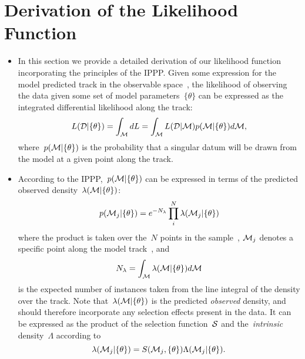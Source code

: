 \documentclass[ms.tex]{subfiles}
\begin{document}
\section{Derivation of the Likelihood Function}
\label{sec:weightnorm}

\begin{itemize}

	\item In this section we provide a detailed derivation of our likelihood
	function incorporating the principles of the IPPP.
	Given some expression for the model predicted track in the observable
	space~, the likelihood of observing the data given some set of
	model parameters~$\{\theta\}$ can be expressed as the integrated
	differential likelihood along the track:
	\begin{equation}
	L(\mathcal{D} | \{\theta\}) = \int_{\mathcal{M}} dL =
	\int_{\mathcal{M}} L(\mathcal{D} | \mathcal{M}) p(\mathcal{M} | \{\theta\})
	d\mathcal{M},
	\end{equation}
	where~$p(\mathcal{M} | \{\theta\})$ is the probability that a singular
	datum will be drawn from the model at a given point along the track.

	\item According to the IPPP,~$p(\mathcal{M} | \{\theta\})$ can be expressed
	in terms of the predicted observed density~$\lambda(\mathcal{M} |
	\{\theta\})$:
	\begin{equation}
	p(\mathcal{M}_j | \{\theta\}) = e^{-N_\lambda}
	\prod_i^N \lambda(\mathcal{M}_j | \{\theta\})
	\end{equation}
	where the product is taken over the~$N$ points in the sample~,
	$_j$ denotes a specific point along the model track~\script{M},
	and
	\begin{equation}
	N_\lambda = \int_{\mathcal{M}} \lambda(\mathcal{M} | \{\theta\}) d\mathcal{M}
	\end{equation}
	is the expected number of instances taken from the line integral of the
	density over the track.
	Note that~$\lambda(\mathcal{M} | \{\theta\})$ is the predicted
	\textit{observed} density, and should therefore incorporate any selection
	effects present in the data.
	It can be expressed as the product of the selection function~$\mathcal{S}$
	and the~\textit{intrinsic} density~$\Lambda$ according to
	\begin{equation}
	\label{eq:lambda_def}
	\lambda(\mathcal{M}_j | \{\theta\}) =
	S(\mathcal{M}_j, \{\theta\})
	\Lambda(\mathcal{M}_j | \{\theta\}).
	\end{equation}


\end{itemize}
\end{document}
